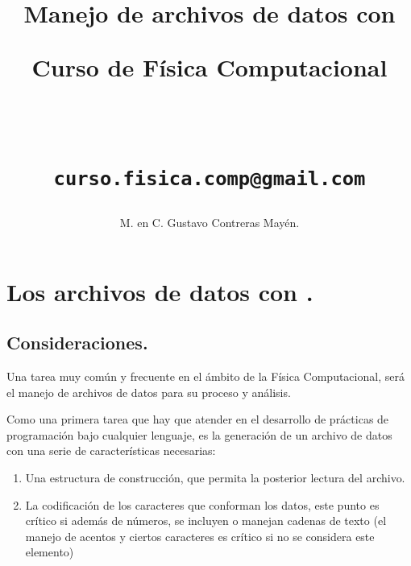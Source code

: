 


\usepackage{fancyhdr}
\pagestyle{fancy}
\fancyhf{}
\fancyhead[L]{\nouppercase{\leftmark}}
\fancyhead[R]{\nouppercase{\rightmark}}
\fancyfoot[C]{\thepage}

\renewcommand{\headrulewidth}{0.5pt}
\setlength{\parskip}{1em}
\renewcommand{\baselinestretch}{1.5}
\usepackage{hyperref}
\hypersetup{colorlinks,linkcolor=,urlcolor=links}



\author{M. en C. Gustavo Contreras Mayén.}
\title{Manejo de archivos de datos con \python \\ \begin{Large} Curso de Física Computacional\end{Large} \\
\begin{small}
\texttt{curso.fisica.comp@gmail.com}
\end{small}}
\date{ }



\maketitle
\fontsize{14}{14}\selectfont

\section{Los archivos de datos con \python.}
\subsection{Consideraciones.}

Una tarea muy común y frecuente en el ámbito de la Física Computacional, será el manejo de archivos de datos para su proceso y análisis.
\par
Como una primera tarea que hay que atender en el desarrollo de prácticas de programación bajo cualquier lenguaje, es la generación de un archivo de datos con una serie de características necesarias:
\begin{enumerate}
\item Una estructura de construcción, que permita la posterior lectura del archivo.
\item La codificación de los caracteres que conforman los datos, este punto es crítico si además de números, se incluyen o manejan cadenas de texto (el manejo de acentos y ciertos caracteres es crítico si no se considera este elemento)
\end{enumerate}
